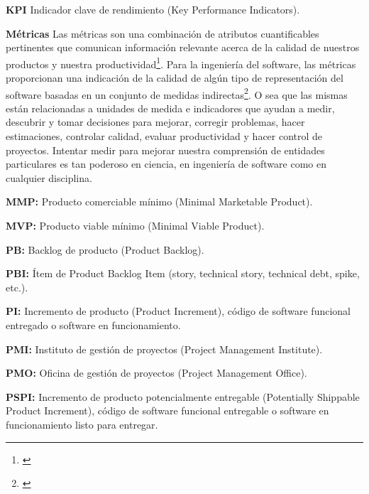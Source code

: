 \begin{description}
  \item {\textbf{KPI} Indicador clave de rendimiento (Key Performance Indicators).}
  
  \item {\textbf{Métricas} Las métricas son una combinación de atributos cuantificables pertinentes que comunican información relevante acerca de la calidad de nuestros productos y nuestra productividad\footnote{\cite{INCOSE-2005}}. Para la ingeniería del software, las métricas proporcionan una indicación de la calidad de algún tipo de representación del software basadas en un conjunto de medidas indirectas\footnote{\cite{Roger-Pressman-2002}}. O sea que las mismas están relacionadas a unidades de medida e indicadores que ayudan a medir, descubrir y tomar decisiones para mejorar, corregir problemas, hacer estimaciones, controlar calidad, evaluar productividad y hacer control de proyectos. Intentar medir para mejorar nuestra comprensión de entidades particulares es tan poderoso en ciencia, en ingeniería de software como en cualquier disciplina.}
  
  \item {\textbf{MMP:} Producto comerciable mínimo (Minimal Marketable Product).}
  
  \item {\textbf{MVP:} Producto viable mínimo (Minimal Viable Product).}
  
  \item {\textbf{PB:} Backlog de producto (Product Backlog).}
  
  \item {\textbf{PBI:} Ítem de Product Backlog Item (story, technical story, technical debt, spike, etc.).}
  
  \item {\textbf{PI:} Incremento de producto (Product Increment), código de software funcional entregado o software en funcionamiento.}
  
  \item {\textbf{PMI:} Instituto de gestión de proyectos (Project Management Institute).}

  \item {\textbf{PMO:} Oficina de gestión de proyectos (Project Management Office).}
  
  \item {\textbf{PSPI:} Incremento de producto potencialmente entregable (Potentially Shippable Product Increment), código de software funcional entregable o software en funcionamiento listo para entregar.}
  

\end{description}

